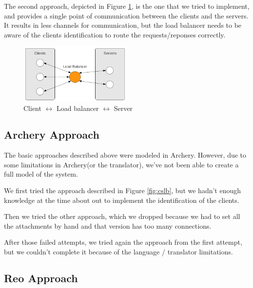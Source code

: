 \documentclass[a4paper]{article}
\newcommand{\ar}{Archery\xspace}
\newcommand{\re}{Reo\xspace}
\begin{document}
The second approach, depicted in Figure \ref{fig:clbs}, is the one that we
tried to implement, and provides a single point of communication between the
clients and the servers. It results in less channels for communication, but the
load balancer needs to be aware of the clients identification to route the
requests/reponses correctly.

\begin{figure}[htb]
	\begin{center}
		\includegraphics[width=0.5\textwidth]{images/c_lb_s.png}
	\end{center}
	\caption{Client $\leftrightarrow$ Load balancer  $\leftrightarrow$ Server }
	\label{fig:clbs}
\end{figure}


\subsection{\ar Approach}

The basic approaches described above were modeled in \ar. However, due to some
limitations in \ar (or the translator), we've not been able to create a full
model of the system.

We first tried the approach described in Figure \ref{fig:cslb}, but we hadn't
enough knowledge at the time about out to implement the identification of the
clients.

Then we tried the other approach, which we dropped because we had to set all
the attachments by hand and that version has too many connections.

After those failed attempts, we tried again the approach from the first
attempt, but we couldn't complete it because of the language / translator
limitations.


\subsection{\re Approach}
\end{document}
